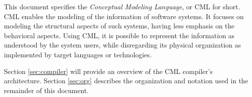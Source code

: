 This document specifies the \emph{Conceptual Modeling Language}, or CML for short.
CML enables the modeling of the information of software systems.
It focuses on modeling the structural aspects of such systems,
having less emphasis on the behavioral aspects.
Using CML,
it is possible to represent the information as understood by the system users,
while disregarding its physical organization as implemented by target languages or technologies.

Section \ref{sec:compiler} will provide an overview of the CML compiler's architecture.
Section \ref{sec:org} describes the organization and notation
used in the remainder of this document.
